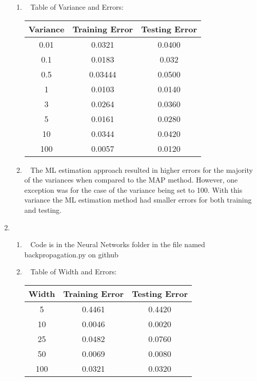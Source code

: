 \documentclass[12pt, fullpage,letterpaper]{article}
\begin{document}
\begin{enumerate}
\begin{enumerate}
		\item~
		\newline Table of Variance and Errors:
		\begin{table}[h]
		\centering
		\begin{tabular}{c|c|c}
		Variance & Training Error & Testing Error\\ 
		\hline\hline
		0.01 & 0.0321 & 0.0400 \\ \hline
		0.1 & 0.0183 & 0.032 \\ \hline
		0.5 & 0.03444 & 0.0500 \\ \hline
		1 & 0.0103 & 0.0140 \\ \hline
		3 & 0.0264 & 0.0360 \\ \hline
		5 & 0.0161 & 0.0280 \\ \hline
		10 & 0.0344 & 0.0420 \\ \hline
		100 & 0.0057 & 0.0120 \\ \hline
		\end{tabular}
		\end{table}
		
		\item~
		\newline The ML estimation approach resulted in higher errors for the majority of the variances when compared to the MAP method. However, one exception was for the case of the variance being set to 100. With this variance the ML estimation method had smaller errors for both training and testing. 
	\end{enumerate}


\item~

\begin{enumerate}
	\item ~
	Code is in the Neural Networks folder in the file named backpropagation.py on github
	\item~
	\newline Table of Width and Errors:
		\begin{table}[h]
		\centering
		\begin{tabular}{c|c|c}
		Width & Training Error & Testing Error\\ 
		\hline\hline
		5 & 0.4461 & 0.4420 \\ \hline
		10 & 0.0046 & 0.0020 \\ \hline
		25 & 0.0482 & 0.0760 \\ \hline
		50 & 0.0069 & 0.0080 \\ \hline
		100 & 0.0321 & 0.0320 \\ \hline
		\end{tabular}
		\end{table}
	

\end{enumerate}
\end{enumerate}
\end{document}

